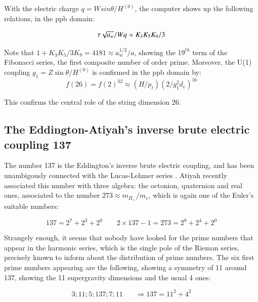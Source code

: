 \documentclass[a4paper,9pt]{article}
\newcounter{row}
\begin{document}
 

With the electric charge $q = Wsin\theta/H^{(0)}$, the computer shows up the following relations, in the ppb domain: 

\begin{equation}\label{Eq32}
 \tau \sqrt{a_w}/ W q \approx K_3 K_5 K_9/3 \\
\end{equation}

Note that $1 + K_3K_5/3K_9 = 4181 \approx a_w^{1/2}/a$, showing the $19^{th}$ term of the Fibonacci series, the first composite number of order prime.
Moreover, the U(1) coupling $g_1 = Z\sin \theta/H^{(0)}$ is confirmed in the ppb domain by:
\begin{equation}\label{Eq33}
 f(26) = f(2)^{32} \approx (H/p_t)(2/g_1^2 d_e)^{16}
 \end{equation}
 
 This confirms the central role of the string dimension 26.
 

 
 
 

\subsection{The Eddington-Atiyah's inverse brute electric coupling 137}

The number 137 is the Eddington's inverse brute electric coupling, and has been unambigously connected with the Lucas-Lehmer series \cite{Sanchez3}. Atiyah recently associated this number with three algebra: the octonion, quaternion and real ones, associated to the number $273 \approx m_{\Pi_+}/m_e $, which is again one of the Euler's suitable numbers:

\begin{equation}\label{Eq34}
137 = 2^7 + 2^3 + 2^0    ~~~~~~~~~2\times 137 - 1 = 273 = 2^8 + 2^4 + 2^0 
 \end{equation}

Strangely enough, it seems that nobody have looked for the prime numbers that appear in the harmonic series, which is the single pole of the Rieman series, precisely known to inform about the distribution of prime numbers. The six first prime numbers appearing are the following, showing a symmetry of 11 around 137, showing the 11 supergravity dimensions and the usual 4 ones:

\begin{equation}\label{Eq35}
3; 11; 5; 137; 7; 11   ~~~~~~~~ \Rightarrow 137 = 11^2 + 4^2 
 \end{equation}
\end{document}
